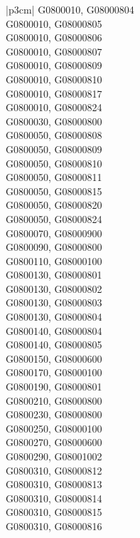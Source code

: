 \begin{customLongTable}{ |p{3cm}| }
G0800010, G08000804 \\ \hline
G0800010, G08000805 \\ \hline
G0800010, G08000806 \\ \hline
G0800010, G08000807 \\ \hline
G0800010, G08000809 \\ \hline
G0800010, G08000810 \\ \hline
G0800010, G08000817 \\ \hline
G0800010, G08000824 \\ \hline
G0800030, G08000800 \\ \hline
G0800050, G08000808 \\ \hline
G0800050, G08000809 \\ \hline
G0800050, G08000810 \\ \hline
G0800050, G08000811 \\ \hline
G0800050, G08000815 \\ \hline
G0800050, G08000820 \\ \hline
G0800050, G08000824 \\ \hline
G0800070, G08000900 \\ \hline
G0800090, G08000800 \\ \hline
G0800110, G08000100 \\ \hline
G0800130, G08000801 \\ \hline
G0800130, G08000802 \\ \hline
G0800130, G08000803 \\ \hline
G0800130, G08000804 \\ \hline
G0800140, G08000804 \\ \hline
G0800140, G08000805 \\ \hline
G0800150, G08000600 \\ \hline
G0800170, G08000100 \\ \hline
G0800190, G08000801 \\ \hline
G0800210, G08000800 \\ \hline
G0800230, G08000800 \\ \hline
G0800250, G08000100 \\ \hline
G0800270, G08000600 \\ \hline
G0800290, G08001002 \\ \hline
G0800310, G08000812 \\ \hline
G0800310, G08000813 \\ \hline
G0800310, G08000814 \\ \hline
G0800310, G08000815 \\ \hline
G0800310, G08000816 \\ \hline

\end{customLongTable}
